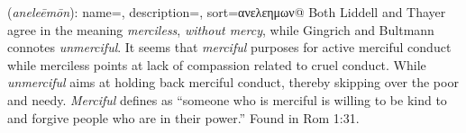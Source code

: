 \item[Unmerciful,]

(\textit{aneleēmōn}):
{
    name=,
    description={},
    sort=ανελεημων@
}
Both Liddell and Thayer agree in the meaning \emph{merciless}, \emph{without mercy}, while Gingrich and Bultmann connotes \emph{unmerciful}. It seems that \emph{merciful} purposes for active merciful conduct while merciless points at lack of compassion related to cruel conduct. While \emph{unmerciful} aims at holding back merciful conduct, thereby skipping over the poor and needy. \emph{Merciful} defines as ``someone who is merciful is willing to be kind to and forgive people who are in their power.''
Found in Rom 1:31.
